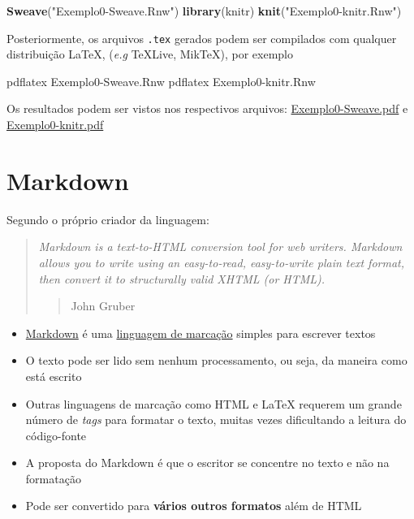 \documentclass[10pt,a4paper]{book}
\newenvironment{Shaded}{\begin{snugshade}}{\end{snugshade}}
\newcommand{\KeywordTok}[1]{\textcolor[rgb]{0.13,0.29,0.53}{\textbf{#1}}}
\newcommand{\StringTok}[1]{\textcolor[rgb]{0.31,0.60,0.02}{#1}}
\newcommand{\ExtensionTok}[1]{#1}
\newcommand{\NormalTok}[1]{#1}
\providecommand{\tightlist}{%
  \setlength{\itemsep}{0pt}\setlength{\parskip}{0pt}}
\begin{document}
\begin{Shaded}
\begin{Highlighting}[]
\KeywordTok{Sweave}\NormalTok{(}\StringTok{"Exemplo0-Sweave.Rnw"}\NormalTok{)}
\KeywordTok{library}\NormalTok{(knitr)}
\KeywordTok{knit}\NormalTok{(}\StringTok{"Exemplo0-knitr.Rnw"}\NormalTok{)}
\end{Highlighting}
\end{Shaded}

Posteriormente, os arquivos \texttt{.tex} gerados podem ser compilados
com qualquer distribuição LaTeX, (\emph{e.g} TeXLive, MikTeX), por
exemplo

\begin{Shaded}
\begin{Highlighting}[]
\ExtensionTok{pdflatex}\NormalTok{ Exemplo0-Sweave.Rnw}
\ExtensionTok{pdflatex}\NormalTok{ Exemplo0-knitr.Rnw}
\end{Highlighting}
\end{Shaded}

Os resultados podem ser vistos nos respectivos arquivos:
\href{exemplos/Exemplo0-Sweave.pdf}{Exemplo0-Sweave.pdf} e
\href{exemplos/Exemplo0-knitr.pdf}{Exemplo0-knitr.pdf}

\section{Markdown}\label{markdown}

Segundo o próprio criador da linguagem:

\begin{quote}
\emph{Markdown is a text-to-HTML conversion tool for web writers.
Markdown allows you to write using an easy-to-read, easy-to-write plain
text format, then convert it to structurally valid XHTML (or HTML).}

\begin{quote}
John Gruber
\end{quote}
\end{quote}

\begin{itemize}
\tightlist
\item
  \href{http://daringfireball.net/projects/markdown}{Markdown} é uma
  \href{https://pt.wikipedia.org/wiki/Linguagem_de_marcação/}{linguagem
  de marcação} simples para escrever textos
\item
  O texto pode ser lido sem nenhum processamento, ou seja, da maneira
  como está escrito
\item
  Outras linguagens de marcação como HTML e LaTeX requerem um grande
  número de \emph{tags} para formatar o texto, muitas vezes dificultando
  a leitura do código-fonte
\item
  A proposta do Markdown é que o escritor se concentre no texto e não na
  formatação
\item
  Pode ser convertido para \textbf{vários outros formatos} além de HTML
\end{itemize}
\end{document}
